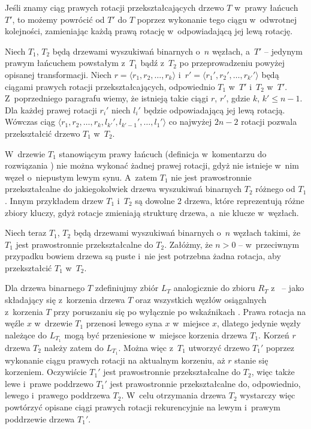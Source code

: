 Jeśli znamy ciąg prawych rotacji przekształcających drzewo $T$ w~prawy łańcuch $T'$, to możemy powrócić od $T'$ do $T$ poprzez wykonanie tego ciągu w~odwrotnej kolejności, zamieniając każdą prawą rotację w~odpowiadającą jej lewą rotację.

Niech $T_1$, $T_2$ będą drzewami wyszukiwań binarnych o~$n$ węzłach, a~$T'$ -- jedynym prawym łańcuchem powstałym z~$T_1$ bądź z~$T_2$ po przeprowadzeniu powyżej opisanej transformacji.
Niech $r=\langle r_1,r_2,\dots,r_k\rangle$ i~$r'=\langle r_1',r_2',\dots,r_{k'}'\rangle$ będą ciągami prawych rotacji przekształcających, odpowiednio $T_1$ w~$T'$ i~$T_2$ w~$T'$.
Z~poprzedniego paragrafu wiemy, że istnieją takie ciągi $r$, $r'$, gdzie $k$, $k'\le n-1$.
Dla każdej prawej rotacji $r_i'$ niech $l_i'$ będzie odpowiadającą jej lewą rotacją.
Wówczas ciąg $\langle r_1,r_2,\dots,r_k,l_{k'}',l_{k'-1}',\dots,l_1'\rangle$ co najwyżej $2n-2$ rotacji pozwala przekształcić drzewo $T_1$ w~$T_2$.

\exercise %

\noindent W~drzewie $T_1$ stanowiącym prawy łańcuch (definicja w~komentarzu do rozwiązania ) nie można wykonać żadnej prawej rotacji, gdyż nie istnieje w~nim węzeł o~niepustym lewym synu.
A~zatem $T_1$ nie jest prawostronnie przekształcalne do jakiegokolwiek drzewa wyszukiwań binarnych $T_2$ różnego od $T_1$.
Innym przykładem drzew $T_1$ i~$T_2$ są dowolne 2 drzewa, które reprezentują różne zbiory kluczy, gdyż rotacje zmieniają strukturę drzewa, a~nie klucze w~węzłach.

Niech teraz $T_1$, $T_2$ będą drzewami wyszukiwań binarnych o~$n$ węzłach takimi, że $T_1$ jest prawostronnie przekształcalne do $T_2$.
Załóżmy, że $n>0$ -- w~przeciwnym przypadku bowiem drzewa są puste i~nie jest potrzebna żadna rotacja, aby przekształcić $T_1$ w~$T_2$.

Dla drzewa binarnego $T$ zdefiniujmy zbiór $L_T$ analogicznie do zbioru $R_T$ z~ -- jako składający się z~korzenia drzewa $T$ oraz wszystkich węzłów osiągalnych z~korzenia $T$ przy poruszaniu się po wyłącznie po wskaźnikach .
Prawa rotacja na węźle $x$ w~drzewie $T_1$ przenosi lewego syna $x$ w~miejsce $x$, dlatego jedynie węzły należące do $L_{T_1}$ mogą być przeniesione w~miejsce korzenia drzewa $T_1$.
Korzeń $r$ drzewa $T_2$ należy zatem do $L_{T_1}$.
Można więc z~$T_1$ utworzyć drzewo $T_1'$ poprzez wykonanie ciągu prawych rotacji na aktualnym korzeniu, aż $r$ stanie się korzeniem.
Oczywiście $T_1'$ jest prawostronnie przekształcalne do $T_2$, więc także lewe i~prawe poddrzewo $T_1'$ jest prawostronnie przekształcalne do, odpowiednio, lewego i~prawego poddrzewa $T_2$.
W~celu otrzymania drzewa $T_2$ wystarczy więc powtórzyć opisane ciągi prawych rotacji rekurencyjnie na lewym i~prawym poddrzewie drzewa $T_1'$.

